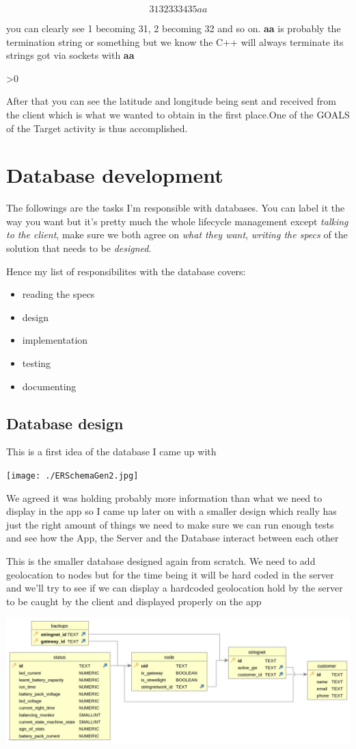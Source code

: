 \documentclass[a4paper,12pt]{book}
\makeatletter
\newcommand{\wrapfill}{\par\ifnum\value{WF@wrappedlines}>0
  \addtocounter{WF@wrappedlines}{-1}%
  \null\vspace{\arabic{WF@wrappedlines}\baselineskip}%
  \WFclear
\fi}
\makeatother
\begin{document}
\[ 3132333435aa \]

\noindent you can clearly see 1 becoming 31, 2 becoming 32 and so on. \textbf{aa} is probably the termination string or something but we know the C++ will always terminate its strings got via sockets with \textbf{aa}

\wrapfill


\noindent After that you can see the latitude and longitude being sent and received from the client which is what we wanted to obtain in the first place.One of the GOALS of the Target activity is thus accomplished.

\part{Database development}

The followings are the tasks I'm responsible with databases. You can label it the way you want but it's pretty much the whole lifecycle management except \emph{talking to the client}, make sure we both agree on \emph{what they want}, \emph{writing the specs} of the solution that needs to be \emph{designed}.

Hence my list of responsibilites with the database covers:

\begin{itemize}
\item {reading the specs}
\item design
\item implementation
\item testing 
\item documenting
\end{itemize}

\clearpage

\chapter{Database design}
This is a first idea of the database I came up with

\noindent\texttt{[image: ./ERSchemaGen2.jpg]}

We agreed it was holding probably more information than what we need to display in the app so I came up later on with a smaller design which really has just the right amount of things we need to make sure we can run enough tests and see how the App, the Server and the Database interact between each other
\clearpage

This is the smaller database designed again from scratch. We need to add geolocation to nodes but for the time being it will be hard coded in the server and we'll try to see if we can display a hardcoded geolocation hold by the server to be caught by the client and displayed properly on the app

\noindent\includegraphics[width=14cm]{./SecondERSchemaGen2.jpg}

\printindex
\end{document}
